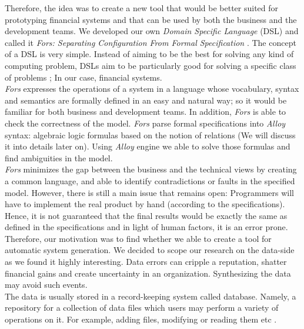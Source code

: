 \documentclass[oneside]{book}
\begin{document}
Therefore, the idea was to create a new tool that would be better suited for prototyping financial systems and that can be used by both the business and the development teams. We developed our own \textit{Domain Specific Language} (DSL) and called it \textit{Fors: Separating Configuration From Formal
Specification} \cite{fors}. The concept of a DSL is very simple. Instead of aiming to be the best for solving any kind of computing problem, DSLs aim to be particularly good for solving a specific class of problems \cite{dsl}; In our case, financial systems. \\

\textit{Fors} expresses the operations of a system in a language whose vocabulary, syntax and semantics are formally defined in an easy and natural way; so it would be familiar for both business and development teams. In addition, \textit{Fors} is able to check the correctness of the model. \textit{Fors} parse formal specifications into \textit{Alloy} syntax: algebraic logic formulas based on the notion of relations (We will discuss it into details later on). Using \textit{Alloy} engine we able to solve those formulas and find ambiguities in the model.\\

\textit{Fors} minimizes the gap between the business and the technical views by creating a common language, and able to identify contradictions or faults in the specified model. However, there is still a main issue that remains open: Programmers will have to implement the real product by hand (according to the specifications). Hence, it is not guaranteed that the final results would be exactly the same as defined in the specifications and in light of human factors, it is an error prone.\\

Therefore, our motivation was to find whether we able to create a tool for automatic system generation. We decided to scope our research on the data-side as we found it highly interesting. Data errors can cripple a reputation, shatter financial gains and create uncertainty in an organization. Synthesizing the data may avoid such events.\\

The data is usually stored in a record-keeping system called database. Namely, a repository for a collection of data files which users may perform a variety of operations on it. For example, adding files, modifying or reading them etc \cite[p.~11]{introtodb}.\\
\end{document}
